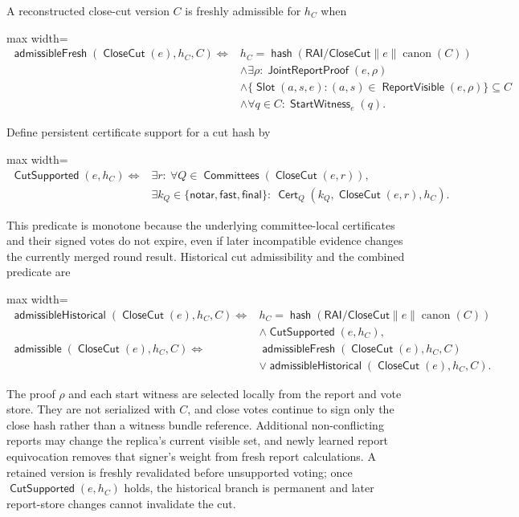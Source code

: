 \documentclass[sigplan,twocolumn,review,anonymous]{acmart}
\newcommand{\func}[1]{\operatorname{\mathsf{#1}}}
\newcommand{\hash}{\func{hash}}
\newcommand{\Cert}{\func{Cert}}
\newcommand{\Slot}{\func{Slot}}
\newcommand{\CloseCut}{\func{CloseCut}}
\newcommand{\admissible}{\func{admissible}}
\newcommand{\admissibleFresh}{\func{admissibleFresh}}
\newcommand{\admissibleHistorical}{\func{admissibleHistorical}}
\newcommand{\notarKind}{\mathsf{notar}}
\newcommand{\fastKind}{\mathsf{fast}}
\newcommand{\finalKind}{\mathsf{final}}
\newcommand{\Committees}{\func{Committees}}
\newcommand{\JointReportProof}{\func{JointReportProof}}
\newcommand{\ReportVisible}{\func{ReportVisible}}
\begin{document}
A reconstructed close-cut version \(C\) is freshly admissible for \(h_C\) when
\begin{center}
\begin{adjustbox}{max width=\columnwidth}
\(\displaystyle
\begin{aligned}
\admissibleFresh(\CloseCut(e),h_C,C)\iff{}&
 h_C=\hash(\mathsf{RAI/CloseCut}\parallel e\parallel\operatorname{canon}(C))\\
&\wedge\exists\rho:\JointReportProof(e,\rho)\\
&\wedge\{\Slot(a,s,e):(a,s)\in\ReportVisible(e,\rho)\}\subseteq C\\
&\wedge\forall q\in C:\func{StartWitness}_e(q).
\end{aligned}
\)
\end{adjustbox}
\end{center}
Define persistent certificate support for a cut hash by
\begin{center}
\begin{adjustbox}{max width=\columnwidth}
\(\displaystyle
\begin{aligned}
\func{CutSupported}(e,h_C)\iff{}&\exists r:\ \forall Q\in\Committees(\CloseCut(e,r)),\\
&\exists k_Q\in\{\notarKind,\fastKind,\finalKind\}:\
\Cert_Q(k_Q,\CloseCut(e,r),h_C).
\end{aligned}
\)
\end{adjustbox}
\end{center}
This predicate is monotone because the underlying committee-local certificates and their signed votes
do not expire, even if later incompatible evidence changes the currently merged round result.
Historical cut admissibility and the combined predicate are
\begin{center}
\begin{adjustbox}{max width=\columnwidth}
\(\displaystyle
\begin{aligned}
\admissibleHistorical(\CloseCut(e),h_C,C)\iff{}&
 h_C=\hash(\mathsf{RAI/CloseCut}\parallel e\parallel\operatorname{canon}(C))\\
&\wedge\func{CutSupported}(e,h_C),\\
\admissible(\CloseCut(e),h_C,C)\iff{}&
 \admissibleFresh(\CloseCut(e),h_C,C)\\
&\vee\admissibleHistorical(\CloseCut(e),h_C,C).
\end{aligned}
\)
\end{adjustbox}
\end{center}
The proof \(\rho\) and each start witness are selected locally from the report and vote store.  They are
not serialized with \(C\), and close votes continue to sign only the close hash rather than a witness
bundle reference.  Additional non-conflicting reports may change the replica's current visible set, and
newly learned report equivocation removes that signer's weight from fresh report calculations.  A
retained version is freshly revalidated before unsupported voting; once \(\func{CutSupported}(e,h_C)\)
holds, the historical branch is permanent and later report-store changes cannot invalidate the cut.
\end{document}
